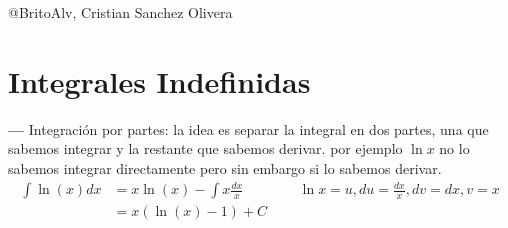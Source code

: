 \documentclass[14pt]{extarticle}
\begin{document}
\begin{center}
      @BritoAlv, Cristian Sanchez Olivera
\end{center}
\section{Integrales Indefinidas}
\textbf{---}   Integración por partes: la idea es separar la integral en dos partes, una que sabemos integrar y la restante que sabemos derivar. por ejemplo $\ln x$ no lo sabemos integrar directamente pero sin embargo si lo sabemos derivar.
\begin{align}
      \int \ln(x)dx
       & = x\ln(x) - \int x \frac{dx}{x} &  & \text{    $\ln x = u, du = \frac{dx}{x}, dv = dx, v = x$} \\
       & = x(\ln(x)-1) + C                                                                              \\
\end{align}
\end{document}
